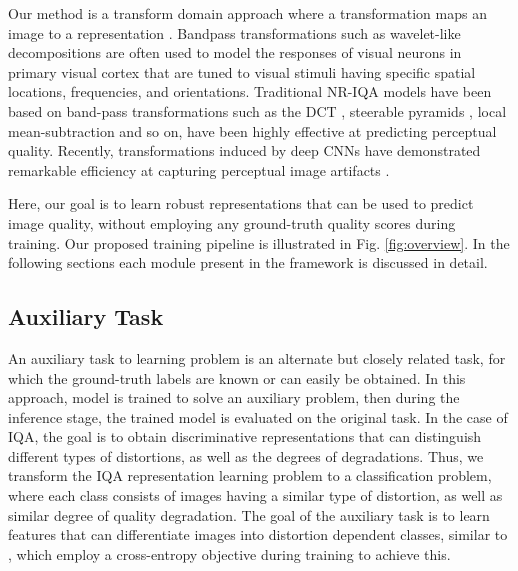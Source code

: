 \documentclass[journal]{IEEEtran}
\begin{document}
Our method is a transform domain approach where a transformation  maps an image  to a representation . Bandpass transformations such as wavelet-like decompositions are often used to model the responses of visual neurons in primary visual cortex that are tuned to visual stimuli having specific spatial locations, frequencies, and orientations. Traditional NR-IQA models have been based on band-pass transformations such as the DCT \cite{saad2012blind}, steerable pyramids \cite{moorthy2011blind}, local mean-subtraction \cite{mittal2012no,mittal2013making} and so on, have been highly effective at predicting perceptual quality. Recently, transformations induced by deep CNNs have demonstrated remarkable efficiency at capturing perceptual image artifacts \cite{zhang2018blind,su2020blindly,zeng2017probabilistic}.

Here, our goal is to learn robust representations that can be used to predict image quality, without employing any ground-truth quality scores during training. Our proposed training pipeline is illustrated in Fig. \ref{fig:overview}. In the following sections each module present in the framework is discussed in detail. 

\subsection{Auxiliary Task}
An auxiliary task to learning problem is an alternate but closely related task, for which the ground-truth labels are known or can easily be obtained. In this approach, model is trained to solve an auxiliary problem, then during the inference stage, the trained model is evaluated on the original task. In the case of IQA, the goal is to obtain discriminative representations that can distinguish different types of distortions, as well as the degrees of degradations. Thus, we transform the IQA representation learning problem to a classification problem, where each class consists of images having a similar type of distortion, as well as similar degree of quality degradation. The goal of the auxiliary task is to learn features that can differentiate images into distortion dependent classes, similar to \cite{zhang2018blind,kim2020dynamic}, which employ a cross-entropy objective during training to achieve this.
\end{document}
